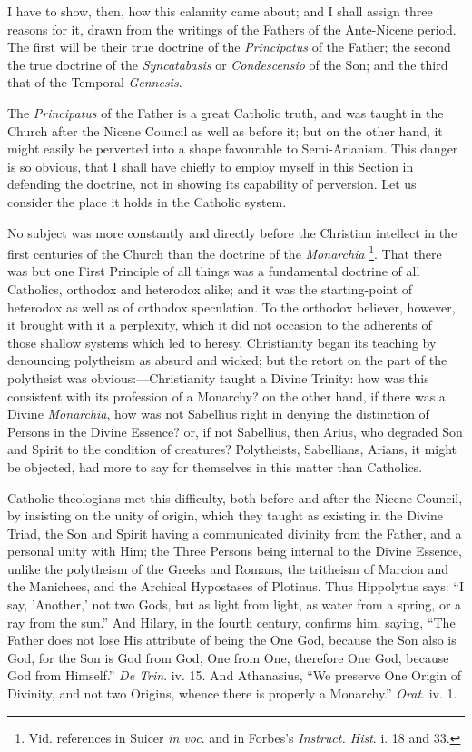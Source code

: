 I have to show, then, how this calamity came about; and I shall
assign three reasons for it, drawn from the writings of the Fathers of
the Ante-Nicene period. The first will be their true doctrine of the \emph{Principatus}
of the Father; the second the true doctrine of the \emph{Syncatabasis}
or \emph{Condescensio} of the Son; and the third that of the Temporal \emph{Gennesis}.


The \emph{Principatus} of the Father is a great Catholic
truth, and was taught in the Church after the Nicene Council as well
as before it; but on the other hand, it might easily be perverted into
a shape favourable to Semi-Arianism. This danger is so obvious, that I
shall have chiefly to employ myself in this Section in defending the
doctrine, not in showing its capability of perversion. Let us consider
the place it holds in the Catholic system.

No subject was more constantly and directly before the Christian
intellect in the first centuries of the Church than the doctrine of
the \emph{Monarchia} \footnote{Vid. references in Suicer \emph{in voc}. and in Forbes's \emph{Instruct.
Hist}. i. 18 and 33.}.
That there was but one First Principle of all things was a
fundamental doctrine of all Catholics, orthodox and heterodox alike;
and it was the starting-point of heterodox as well as of orthodox
speculation. To the orthodox believer, however, it brought with it a
perplexity, which it did not occasion to the adherents of those
shallow systems which led to heresy. Christianity began its teaching
by denouncing polytheism as absurd and wicked; but the retort on the
part of the polytheist was obvious:—Christianity taught a Divine
Trinity: how was this consistent with its profession of a Monarchy? on
the other hand, if there was a Divine \emph{Monarchia}, how was
not Sabellius right in denying the distinction of Persons in the
Divine Essence? or, if not Sabellius, then Arius, who degraded Son and
Spirit to the condition of creatures? Polytheists, Sabellians, Arians,
it might be objected, had more to say for themselves in this matter
than Catholics.

Catholic theologians met this difficulty, both before and after the
Nicene Council, by insisting on the unity of origin, which they taught
as existing in the Divine Triad, the Son and Spirit having a
communicated divinity from the Father, and a personal unity with Him;
the Three Persons being internal to the Divine Essence, unlike the
polytheism of the Greeks and Romans, the tritheism of Marcion and the
Manichees, and the Archical Hypostases of Plotinus. Thus Hippolytus
says: ``I say, 'Another,' not two Gods, but as light from light,
as water from a spring, or a ray from the sun.'' And Hilary, in
the fourth century, confirms him, saying, ``The Father does not
lose His attribute of being the One God, because the Son also is God,
for the Son is God from God, One from One, therefore One God, because
God from Himself.'' \emph{De Trin}. iv. 15. And Athanasius,
``We preserve One Origin of Divinity, and not two Origins, whence
there is properly a Monarchy.'' \emph{Orat}. iv. 1.

